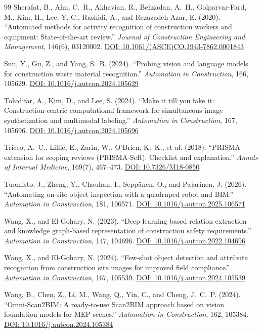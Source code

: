 \documentclass[10pt,letterpaper]{article}
\begin{document}
\begin{thebibliography}{99}
 Sherafat, B., Ahn, C.~R., Akhavian, R., Behzadan, A.~H., Golparvar-Fard, M., Kim, H., Lee, Y.-C., Rashidi, A., and Rezazadeh Azar, E. (2020). ``Automated methods for activity recognition of construction workers and equipment: State-of-the-art review.'' \textit{Journal of Construction Engineering and Management}, 146(6), 03120002. \href{https://doi.org/10.1061/(ASCE)CO.1943-7862.0001843}{DOI: 10.1061/(ASCE)CO.1943-7862.0001843}

 Sun, Y., Gu, Z., and Yang, S.~B. (2024). ``Probing vision and language models for construction waste material recognition.'' \textit{Automation in Construction}, 166, 105629. \href{https://doi.org/10.1016/j.autcon.2024.105629}{DOI: 10.1016/j.autcon.2024.105629}

 Tohidifar, A., Kim, D., and Lee, S. (2024). ``Make it till you fake it: Construction-centric computational framework for simultaneous image synthetization and multimodal labeling.'' \textit{Automation in Construction}, 167, 105696. \href{https://doi.org/10.1016/j.autcon.2024.105696}{DOI: 10.1016/j.autcon.2024.105696}

 Tricco, A.~C., Lillie, E., Zarin, W., O'Brien, K.~K., et al. (2018). ``PRISMA extension for scoping reviews (PRISMA-ScR): Checklist and explanation.'' \textit{Annals of Internal Medicine}, 169(7), 467--473. \href{https://doi.org/10.7326/M18-0850}{DOI: 10.7326/M18-0850}

 Tuomisto, J., Zheng, Y., Chauhan, I., Sepp\"anen, O., and Pajarinen, J. (2026). ``Automating on-site object inspection with a quadruped robot and BIM.'' \textit{Automation in Construction}, 181, 106571. \href{https://doi.org/10.1016/j.autcon.2025.106571}{DOI: 10.1016/j.autcon.2025.106571}

 Wang, X., and El-Gohary, N. (2023). ``Deep learning-based relation extraction and knowledge graph-based representation of construction safety requirements.'' \textit{Automation in Construction}, 147, 104696. \href{https://doi.org/10.1016/j.autcon.2022.104696}{DOI: 10.1016/j.autcon.2022.104696}

 Wang, X., and El-Gohary, N. (2024). ``Few-shot object detection and attribute recognition from construction site images for improved field compliance.'' \textit{Automation in Construction}, 167, 105539. \href{https://doi.org/10.1016/j.autcon.2024.105539}{DOI: 10.1016/j.autcon.2024.105539}

 Wang, B., Chen, Z., Li, M., Wang, Q., Yin, C., and Cheng, J.~C.~P. (2024). ``Omni-Scan2BIM: A ready-to-use Scan2BIM approach based on vision foundation models for MEP scenes.'' \textit{Automation in Construction}, 162, 105384. \href{https://doi.org/10.1016/j.autcon.2024.105384}{DOI: 10.1016/j.autcon.2024.105384}


\end{thebibliography}
\end{document}
